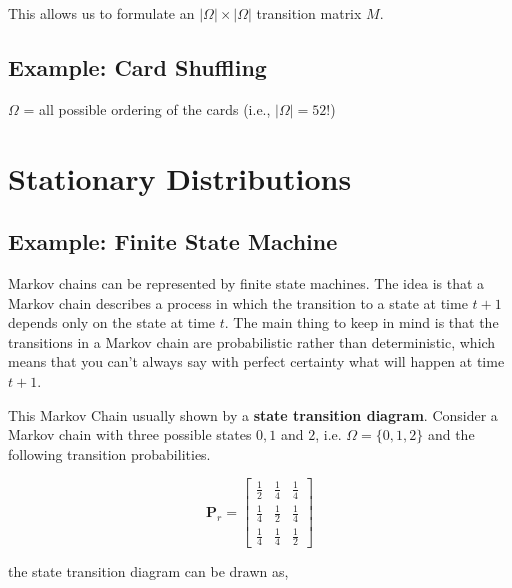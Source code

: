 \documentclass[twoside]{article}
\begin{document}
This allows us to formulate an $|\Omega| \times |\Omega|$ transition matrix $M$.

\subsection{Example: Card Shuffling}

$\Omega$ = all possible ordering of the cards (i.e., $|\Omega| = 52!$)


\section{Stationary Distributions}

\subsection{Example: Finite State Machine}
Markov chains can be represented by finite state machines. The idea is that a Markov chain describes a process in which the transition to a state at time $t+1$ depends only on the state at time $t$. The main thing to keep in mind is that the transitions in a Markov chain are probabilistic rather than deterministic, which means that you can't always say with perfect certainty what will happen at time $t+1$.

This Markov Chain usually shown by a \textbf{state transition diagram}. Consider a Markov chain with three possible states $0, 1$ and $2$, i.e. $\Omega = \{0,1,2\}$ and the following transition probabilities.

\begin{equation}\mathbf{P}_r=\left[\begin{array}{ccc}
\frac{1}{2} & \frac{1}{4} & \frac{1}{4} \\
\frac{1}{4} & \frac{1}{2} & \frac{1}{4} \\
\frac{1}{4} & \frac{1}{4} & \frac{1}{2}
\end{array}\right]\end{equation}

the state transition diagram can be drawn as,
\end{document}
